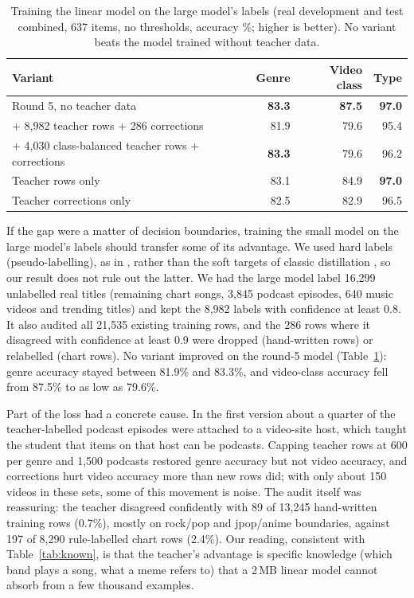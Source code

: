 \documentclass[11pt]{article}
\begin{document}
\begin{table}[t]
  \centering
  \small
  \caption{Training the linear model on the large model's labels (real development and test combined, 637 items, no thresholds, accuracy \%; higher is better). No variant beats the model trained without teacher data.}
  \label{tab:distill}
  \begin{tabular}{@{}lrrr@{}}
    \toprule
    Variant & Genre & Video class & Type \\
    \midrule
    Round 5, no teacher data & \textbf{83.3} & \textbf{87.5} & \textbf{97.0} \\
    + 8,982 teacher rows + 286 corrections & 81.9 & 79.6 & 95.4 \\
    + 4,030 class-balanced teacher rows + corrections & \textbf{83.3} & 79.6 & 96.2 \\
    Teacher rows only & 83.1 & 84.9 & \textbf{97.0} \\
    Teacher corrections only & 82.5 & 82.9 & 96.5 \\
    \bottomrule
  \end{tabular}
\end{table}

If the gap were a matter of decision boundaries, training the small model on the large model's labels should transfer some of its advantage. We used hard labels (pseudo-labelling), as in \citet{wang2021want}, rather than the soft targets of classic distillation \citep{hinton2015distilling}, so our result does not rule out the latter. We had the large model label 16,299 unlabelled real titles (remaining chart songs, 3,845 podcast episodes, 640 music videos and trending titles) and kept the 8,982 labels with confidence at least 0.8. It also audited all 21,535 existing training rows, and the 286 rows where it disagreed with confidence at least 0.9 were dropped (hand-written rows) or relabelled (chart rows). No variant improved on the round-5 model (Table~\ref{tab:distill}): genre accuracy stayed between 81.9\% and 83.3\%, and video-class accuracy fell from 87.5\% to as low as 79.6\%.

Part of the loss had a concrete cause. In the first version about a quarter of the teacher-labelled podcast episodes were attached to a video-site host, which taught the student that items on that host can be podcasts. Capping teacher rows at 600 per genre and 1,500 podcasts restored genre accuracy but not video accuracy, and corrections hurt video accuracy more than new rows did; with only about 150 videos in these sets, some of this movement is noise. The audit itself was reassuring: the teacher disagreed confidently with 89 of 13,245 hand-written training rows (0.7\%), mostly on rock/pop and jpop/anime boundaries, against 197 of 8,290 rule-labelled chart rows (2.4\%). Our reading, consistent with Table~\ref{tab:known}, is that the teacher's advantage is specific knowledge (which band plays a song, what a meme refers to) that a 2\,MB linear model cannot absorb from a few thousand examples.
\end{document}
